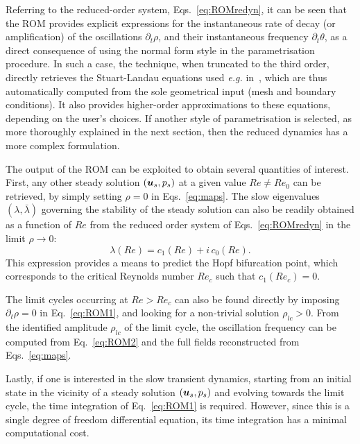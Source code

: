 \documentclass[%
reprint,
superscriptaddress,
 amsmath,amssymb,
 aps,
 pre
]{revtex4-2}
\begin{document}
Referring to the reduced-order system, Eqs.~\eqref{eq:ROMredyn}, it can be seen that the ROM provides explicit expressions for the instantaneous rate of decay (or amplification) of the oscillations $\partial_t\rho$, and their instantaneous frequency $\partial_t\theta$, as a direct consequence of using the normal form style in the parametrisation procedure. In such a case, the technique, when truncated to the third order, directly retrieves the Stuart-Landau equations used \textit{e.g.} in~\cite{SIPP_LEBEDEV_2007,GallairePush}, which are thus automatically computed from the sole geometrical input (mesh and boundary conditions). It also provides higher-order approximations to these equations, depending on the user's choices. If another style of parametrisation is selected, as more thoroughly explained in the next section, then the reduced dynamics has a more complex formulation.


The output of the ROM can be exploited to obtain several quantities of interest. First, any other steady solution $({\boldsymbol{u}}_s,p_s)$ at a given value $Re\neq Re_0$ can be retrieved, by simply setting $\rho=0$ in Eqs.~\eqref{eq:maps}. The slow eigenvalues $(\lambda,\bar{\lambda})$ governing the stability of the steady solution can also be readily obtained as a function of $Re$ from the reduced order system of Eqs.~\eqref{eq:ROMredyn} in the limit $\rho\rightarrow 0$:
\begin{equation}
\label{eq:eigen_at_Re}
    \lambda(Re) = c_1(Re) + i\, c_0(Re).
\end{equation}
This expression provides a means to predict the Hopf bifurcation point, which corresponds to the critical Reynolds number $Re_c$ such that $c_1 (Re_c) = 0$.


The limit cycles occurring at $Re>Re_c$ can also be found directly by imposing $\partial_t\rho = 0$ in Eq.~\eqref{eq:ROM1}, and looking for a non-trivial solution $\rho_{lc}>0$. From the identified amplitude $\rho_{lc}$ of the limit cycle, the oscillation frequency can be computed from Eq.~\eqref{eq:ROM2} and the full fields reconstructed from Eqs.~\eqref{eq:maps}.


Lastly, if one is interested in the slow transient dynamics, starting from an initial state in the vicinity of a steady solution $({\boldsymbol{u}}_s, p_s)$ and evolving towards the limit cycle, the time integration of Eq.~\eqref{eq:ROM1} is required. However, since this is a single degree of freedom differential equation, its time integration has a minimal computational cost.
\end{document}
